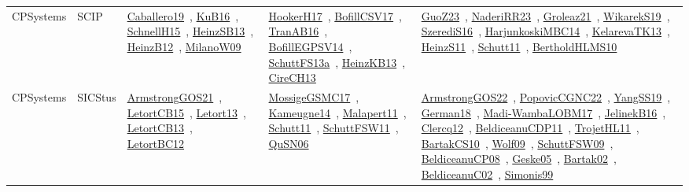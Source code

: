 {\begin{longtable}{lp{3cm}>{\raggedright\arraybackslash}p{6cm}>{\raggedright\arraybackslash}p{6cm}>{\raggedright\arraybackslash}p{8cm}}
CPSystems & SCIP & \href{works/Caballero19.pdf}{Caballero19}~\cite{Caballero19}, \href{works/KuB16.pdf}{KuB16}~\cite{KuB16}, \href{works/SchnellH15.pdf}{SchnellH15}~\cite{SchnellH15}, \href{works/HeinzSB13.pdf}{HeinzSB13}~\cite{HeinzSB13}, \href{works/HeinzB12.pdf}{HeinzB12}~\cite{HeinzB12}, \href{works/MilanoW09.pdf}{MilanoW09}~\cite{MilanoW09} & \href{works/HookerH17.pdf}{HookerH17}~\cite{HookerH17}, \href{works/BofillCSV17.pdf}{BofillCSV17}~\cite{BofillCSV17}, \href{works/TranAB16.pdf}{TranAB16}~\cite{TranAB16}, \href{works/BofillEGPSV14.pdf}{BofillEGPSV14}~\cite{BofillEGPSV14}, \href{works/SchuttFS13a.pdf}{SchuttFS13a}~\cite{SchuttFS13a}, \href{works/HeinzKB13.pdf}{HeinzKB13}~\cite{HeinzKB13}, \href{works/CireCH13.pdf}{CireCH13}~\cite{CireCH13} & \href{works/GuoZ23.pdf}{GuoZ23}~\cite{GuoZ23}, \href{works/NaderiRR23.pdf}{NaderiRR23}~\cite{NaderiRR23}, \href{works/Groleaz21.pdf}{Groleaz21}~\cite{Groleaz21}, \href{works/WikarekS19.pdf}{WikarekS19}~\cite{WikarekS19}, \href{works/SzerediS16.pdf}{SzerediS16}~\cite{SzerediS16}, \href{works/HarjunkoskiMBC14.pdf}{HarjunkoskiMBC14}~\cite{HarjunkoskiMBC14}, \href{works/KelarevaTK13.pdf}{KelarevaTK13}~\cite{KelarevaTK13}, \href{works/HeinzS11.pdf}{HeinzS11}~\cite{HeinzS11}, \href{works/Schutt11.pdf}{Schutt11}~\cite{Schutt11}, \href{works/BertholdHLMS10.pdf}{BertholdHLMS10}~\cite{BertholdHLMS10}\\
CPSystems & SICStus & \href{works/ArmstrongGOS21.pdf}{ArmstrongGOS21}~\cite{ArmstrongGOS21}, \href{works/LetortCB15.pdf}{LetortCB15}~\cite{LetortCB15}, \href{works/Letort13.pdf}{Letort13}~\cite{Letort13}, \href{works/LetortCB13.pdf}{LetortCB13}~\cite{LetortCB13}, \href{works/LetortBC12.pdf}{LetortBC12}~\cite{LetortBC12} & \href{works/MossigeGSMC17.pdf}{MossigeGSMC17}~\cite{MossigeGSMC17}, \href{works/Kameugne14.pdf}{Kameugne14}~\cite{Kameugne14}, \href{works/Malapert11.pdf}{Malapert11}~\cite{Malapert11}, \href{works/Schutt11.pdf}{Schutt11}~\cite{Schutt11}, \href{works/SchuttFSW11.pdf}{SchuttFSW11}~\cite{SchuttFSW11}, \href{works/QuSN06.pdf}{QuSN06}~\cite{QuSN06} & \href{works/ArmstrongGOS22.pdf}{ArmstrongGOS22}~\cite{ArmstrongGOS22}, \href{works/PopovicCGNC22.pdf}{PopovicCGNC22}~\cite{PopovicCGNC22}, \href{works/YangSS19.pdf}{YangSS19}~\cite{YangSS19}, \href{works/German18.pdf}{German18}~\cite{German18}, \href{works/Madi-WambaLOBM17.pdf}{Madi-WambaLOBM17}~\cite{Madi-WambaLOBM17}, \href{works/JelinekB16.pdf}{JelinekB16}~\cite{JelinekB16}, \href{works/Clercq12.pdf}{Clercq12}~\cite{Clercq12}, \href{works/BeldiceanuCDP11.pdf}{BeldiceanuCDP11}~\cite{BeldiceanuCDP11}, \href{works/TrojetHL11.pdf}{TrojetHL11}~\cite{TrojetHL11}, \href{works/BartakCS10.pdf}{BartakCS10}~\cite{BartakCS10}, \href{works/Wolf09.pdf}{Wolf09}~\cite{Wolf09}, \href{works/SchuttFSW09.pdf}{SchuttFSW09}~\cite{SchuttFSW09}, \href{works/BeldiceanuCP08.pdf}{BeldiceanuCP08}~\cite{BeldiceanuCP08}, \href{works/Geske05.pdf}{Geske05}~\cite{Geske05}, \href{works/Bartak02.pdf}{Bartak02}~\cite{Bartak02}, \href{works/BeldiceanuC02.pdf}{BeldiceanuC02}~\cite{BeldiceanuC02}, \href{works/Simonis99.pdf}{Simonis99}~\cite{Simonis99}\\

\end{longtable}}
